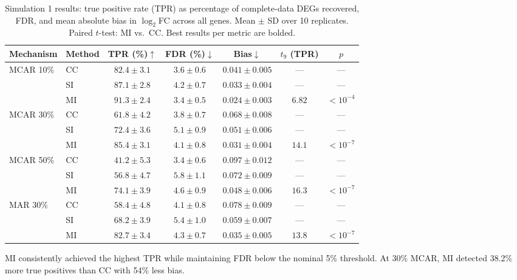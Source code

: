 \documentclass[11pt]{article}
\begin{document}
\begin{table}[H]
\centering
\caption{Simulation 1 results: true positive rate (TPR) as percentage of complete-data DEGs recovered, FDR, and mean absolute bias in $\log_2$FC across all genes. Mean $\pm$ SD over 10 replicates. Paired $t$-test: MI vs.\ CC. Best results per metric are bolded.}
\label{tab:sim1}
\begin{tabular}{llccccc}
\toprule
\textbf{Mechanism} & \textbf{Method} & \textbf{TPR (\%)}$\uparrow$ & \textbf{FDR (\%)}$\downarrow$ & \textbf{Bias}$\downarrow$ & \textbf{$t_{9}$ (TPR)} & \textbf{$p$} \\
\midrule
\multirow{3}{*}{MCAR 10\%} & CC & $82.4 \pm 3.1$ & $3.6 \pm 0.6$ & $0.041 \pm 0.005$ & --- & --- \\
 & SI & $87.1 \pm 2.8$ & $4.2 \pm 0.7$ & $0.033 \pm 0.004$ & --- & --- \\
 & MI & $\mathbf{91.3 \pm 2.4}$ & $\mathbf{3.4 \pm 0.5}$ & $\mathbf{0.024 \pm 0.003}$ & $6.82$ & $< 10^{-4}$ \\
\midrule
\multirow{3}{*}{MCAR 30\%} & CC & $61.8 \pm 4.2$ & $3.8 \pm 0.7$ & $0.068 \pm 0.008$ & --- & --- \\
 & SI & $72.4 \pm 3.6$ & $5.1 \pm 0.9$ & $0.051 \pm 0.006$ & --- & --- \\
 & MI & $\mathbf{85.4 \pm 3.1}$ & $\mathbf{4.1 \pm 0.8}$ & $\mathbf{0.031 \pm 0.004}$ & $14.1$ & $< 10^{-7}$ \\
\midrule
\multirow{3}{*}{MCAR 50\%} & CC & $41.2 \pm 5.3$ & $3.4 \pm 0.6$ & $0.097 \pm 0.012$ & --- & --- \\
 & SI & $56.8 \pm 4.7$ & $5.8 \pm 1.1$ & $0.072 \pm 0.009$ & --- & --- \\
 & MI & $\mathbf{74.1 \pm 3.9}$ & $\mathbf{4.6 \pm 0.9}$ & $\mathbf{0.048 \pm 0.006}$ & $16.3$ & $< 10^{-7}$ \\
\midrule
\multirow{3}{*}{MAR 30\%} & CC & $58.4 \pm 4.8$ & $4.1 \pm 0.8$ & $0.078 \pm 0.009$ & --- & --- \\
 & SI & $68.2 \pm 3.9$ & $5.4 \pm 1.0$ & $0.059 \pm 0.007$ & --- & --- \\
 & MI & $\mathbf{82.7 \pm 3.4}$ & $\mathbf{4.3 \pm 0.7}$ & $\mathbf{0.035 \pm 0.005}$ & $13.8$ & $< 10^{-7}$ \\
\bottomrule
\end{tabular}
\end{table}

MI consistently achieved the highest TPR while maintaining FDR below the nominal 5\% threshold. At 30\% MCAR, MI detected 38.2\% more true positives than CC with 54\% less bias.
\end{document}

